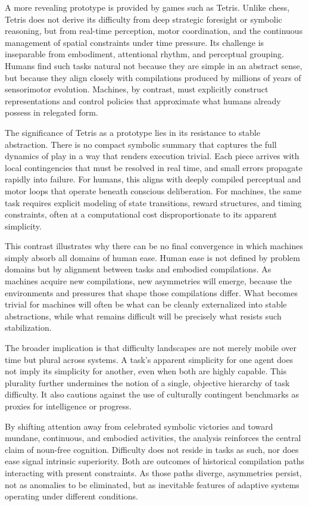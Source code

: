 \documentclass[12pt]{article}
\begin{document}
A more revealing prototype is provided by games such as Tetris. Unlike chess, Tetris does not derive its difficulty from deep strategic foresight or symbolic reasoning, but from real-time perception, motor coordination, and the continuous management of spatial constraints under time pressure. Its challenge is inseparable from embodiment, attentional rhythm, and perceptual grouping. Humans find such tasks natural not because they are simple in an abstract sense, but because they align closely with compilations produced by millions of years of sensorimotor evolution. Machines, by contrast, must explicitly construct representations and control policies that approximate what humans already possess in relegated form.

The significance of Tetris as a prototype lies in its resistance to stable abstraction. There is no compact symbolic summary that captures the full dynamics of play in a way that renders execution trivial. Each piece arrives with local contingencies that must be resolved in real time, and small errors propagate rapidly into failure. For humans, this aligns with deeply compiled perceptual and motor loops that operate beneath conscious deliberation. For machines, the same task requires explicit modeling of state transitions, reward structures, and timing constraints, often at a computational cost disproportionate to its apparent simplicity.

This contrast illustrates why there can be no final convergence in which machines simply absorb all domains of human ease. Human ease is not defined by problem domains but by alignment between tasks and embodied compilations. As machines acquire new compilations, new asymmetries will emerge, because the environments and pressures that shape those compilations differ. What becomes trivial for machines will often be what can be cleanly externalized into stable abstractions, while what remains difficult will be precisely what resists such stabilization.

The broader implication is that difficulty landscapes are not merely mobile over time but plural across systems. A task’s apparent simplicity for one agent does not imply its simplicity for another, even when both are highly capable. This plurality further undermines the notion of a single, objective hierarchy of task difficulty. It also cautions against the use of culturally contingent benchmarks as proxies for intelligence or progress.

By shifting attention away from celebrated symbolic victories and toward mundane, continuous, and embodied activities, the analysis reinforces the central claim of noun-free cognition. Difficulty does not reside in tasks as such, nor does ease signal intrinsic superiority. Both are outcomes of historical compilation paths interacting with present constraints. As those paths diverge, asymmetries persist, not as anomalies to be eliminated, but as inevitable features of adaptive systems operating under different conditions.
\end{document}
